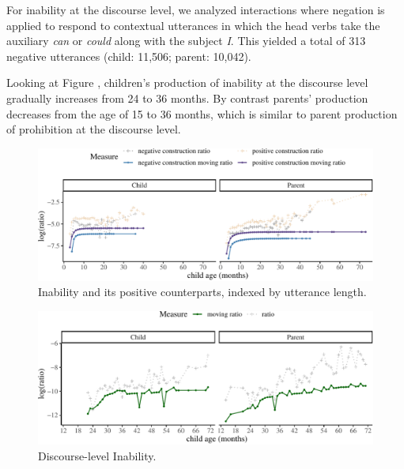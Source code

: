 \documentclass[
  english,
  man,floatsintext]{apa6}
\begin{document}
For inability at the discourse level, we analyzed interactions where negation is applied to respond to contextual utterances in which the head verbs take the auxiliary \emph{can} or \emph{could} along with the subject \emph{I}. This yielded a total of 313 negative utterances (child: 11,506; parent: 10,042).

Looking at Figure , children's production of inability at the discourse level gradually increases from 24 to 36 months. By contrast parents' production decreases from the age of 15 to 36 months, which is similar to parent production of prohibition at the discourse level.

\begin{figure}[H]

{\centering \includegraphics{neg_construction_article_files/figure-latex/inabilityul-1} 

}

\caption{Inability and its positive counterparts, indexed by utterance length.}\label{fig:inabilityul}
\end{figure}

\begin{figure}[H]

{\centering \includegraphics{neg_construction_article_files/figure-latex/inabilitydiscourse-1} 

}

\caption{Discourse-level Inability.}\label{fig:inabilitydiscourse}
\end{figure}
\end{document}
